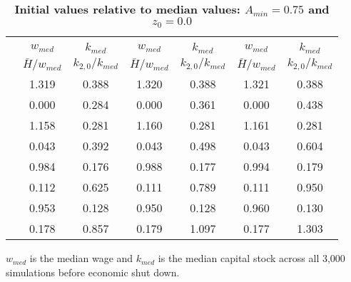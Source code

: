\documentclass[letterpaper,12pt]{article}
\theoremstyle{definition}
\begin{document}
\begin{spacing}{1.5}
  \begin{table}[htbp]\centering\captionsetup{width=5.3in}
  \caption{\label{TabInitVal_A75}\textbf{Initial values relative to median values: $A_{min}=0.75$ and $z_0=0.0$}}
    \begin{threeparttable}
    \begin{tabular}{>{\small}c| >{\small}c >{\small}c| >{\small}c >{\small}c| >{\small}c >{\small}c}
      \hline\hline
      & \multicolumn{2}{c}{$k_{2,0}=0.11$} & \multicolumn{2}{c}{$k_{2,0}=0.14$} & \multicolumn{2}{c}{$k_{2,0}=0.17$} \\ \cline{2-7}
      & $w_{med}$ & $k_{med}$ & $w_{med}$ & $k_{med}$ & $w_{med}$ & $k_{med}$ \\
      & $\bar{H}/w_{med}$ & $k_{2,0}/k_{med}$ & $\bar{H}/w_{med}$ & $k_{2,0}/k_{med}$ & $\bar{H}/w_{med}$ & $k_{2,0}/k_{med}$ \\
      \hline
      \multirow{2}{*}{$\bar{H}=0.00$}
      & 1.319 & 0.388 & 1.320 & 0.388 & 1.321 & 0.388 \\
      & 0.000 & 0.284 & 0.000 & 0.361 & 0.000 & 0.438 \\
      \hline
      \multirow{2}{*}{$\bar{H}=0.05$}
      & 1.158 & 0.281 & 1.160 & 0.281 & 1.161 & 0.281 \\
      & 0.043 & 0.392 & 0.043 & 0.498 & 0.043 & 0.604 \\
      \hline
      \multirow{2}{*}{$\bar{H}=0.11$}
      & 0.984 & 0.176 & 0.988 & 0.177 & 0.994 & 0.179 \\
      & 0.112 & 0.625 & 0.111 & 0.789 & 0.111 & 0.950 \\
      \hline
      \multirow{2}{*}{$\bar{H}=0.17$}
      & 0.953 & 0.128 & 0.950 & 0.128 & 0.960 & 0.130 \\
      & 0.178 & 0.857 & 0.179 & 1.097 & 0.177 & 1.303 \\
      \hline\hline
    \end{tabular}
    \begin{tablenotes}
      \scriptsize{\item[]$w_{med}$ is the median wage and $k_{med}$ is the median capital stock across all 3,000 simulations before economic shut down.}
    \end{tablenotes}
    \end{threeparttable}
  \end{table}


\end{spacing}
\end{document}
